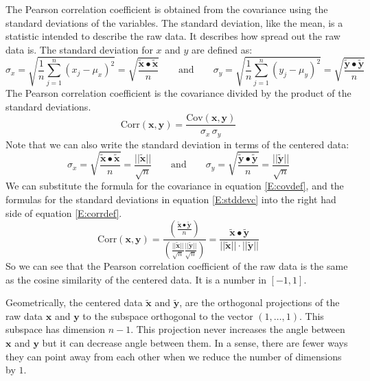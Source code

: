    The Pearson correlation coefficient is obtained from the covariance using
the standard deviations of the variables. The standard deviation, like the 
mean, is a statistic intended to describe the raw data. It describes how 
spread out the raw data is. The standard deviation for $x$ and $y$ are defined
as:
\begin{equation}
    \sigma_x = \sqrt{ \frac{1}{n} \sum_{j=1}^n (x_j - \mu_x)^2} = \sqrt{ \frac{\widetilde{\mathbf{x}} \bullet \widetilde{\mathbf{x}}}{n}}
\qquad \mbox{and} \qquad 
    \sigma_y = \sqrt{ \frac{1}{n} \sum_{j=1}^n (y_j - \mu_y)^2} = \sqrt{ \frac{\widetilde{\mathbf{y}} \bullet \widetilde{\mathbf{y}}}{n}}
\end{equation}
The Pearson correlation coefficient is the covariance divided by the product of
the standard deviations.
\begin{equation}\label{E:corrdef}
\mathrm{Corr}(\mathbf{x}, \mathbf{y}) = 
\frac{\mathrm{Cov}(\mathbf{x}, \mathbf{y})}{\sigma_x \, \sigma_y}
\end{equation}
Note that we can also write the standard deviation in terms of the centered data:
\begin{equation}\label{E:stddevc}
  \sigma_x = \sqrt{ \frac{\widetilde{\mathbf{x}} \bullet \widetilde{\mathbf{x}}}{n}}
= \frac{||\widetilde{\mathbf{x}}||}{\sqrt{n}}
\qquad \mbox{and} \qquad 
  \sigma_y = \sqrt{ \frac{\widetilde{\mathbf{y}} \bullet \widetilde{\mathbf{y}}}{n}}
= \frac{||\widetilde{\mathbf{y}}||}{\sqrt{n}}
\end{equation}
We can substitute the formula for the covariance in equation \eqref{E:covdef},
and the formulas for the standard deviations in equation \eqref{E:stddevc}
into the right had side of equation \eqref{E:corrdef}.
\begin{equation}
\mathrm{Corr}(\mathbf{x}, \mathbf{y}) = 
\frac{\left(\displaystyle{\frac{\widetilde{\mathbf{x}} \bullet 
                                                 \widetilde{\mathbf{y}}}{n}}\right)}
     {\left(\displaystyle{\frac{||\widetilde{\mathbf{x}}||}{\sqrt{n}}
               \frac{||\widetilde{\mathbf{y}}||}{\sqrt{n}} }\right)}
= \frac{\widetilde{\mathbf{x}} \bullet \widetilde{\mathbf{y}}}
       {||\widetilde{\mathbf{x}}|| \cdot ||\widetilde{\mathbf{y}}||} 
\end{equation}
So we can see that the Pearson correlation coefficient of the raw data is the
same as the cosine similarity of the centered data. It is a number in 
$[-1,1]$. 

    Geometrically, the centered data $\widetilde{\mathbf{x}}$ and 
$\widetilde{\mathbf{y}}$, are the orthogonal projections of the raw data 
$\mathbf{x}$ and $\mathbf{y}$ to the subspace orthogonal to the vector 
$(1, \dots, 1)$. This subspace has dimension $n - 1$. This projection 
never increases the angle between $\mathbf{x}$ and $\mathbf{y}$ but it can 
decrease angle between them. In a sense, there are fewer ways they can point 
away from each other when we reduce the number of dimensions by $1$. 

